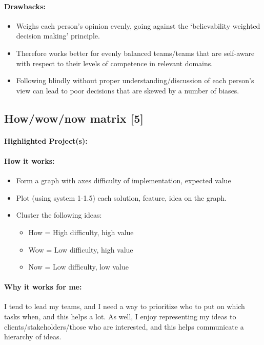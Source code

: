\documentclass[a4paper,12pt]{article}
\begin{document}
\paragraph{Drawbacks: }
\begin{itemize}
	\item Weighs each person’s opinion evenly, going against the ‘believability weighted decision making’ principle.
	\item Therefore works better for evenly balanced teams/teams that are self-aware with respect to their levels of competence in relevant domains.
	\item Following blindly without proper understanding/discussion of each person’s view can lead to poor decisions that are skewed by a number of biases.
\end{itemize}

\subsection{How/wow/now matrix [5]}
\paragraph{Highlighted Project(s): }
\paragraph{How it works: } 
\begin{itemize}
\item Form a graph with axes {difficulty of implementation, expected value}
\item Plot (using system 1-1.5) each solution, feature, idea on the graph.
\item Cluster the following ideas:
\begin{itemize}
\item How = High difficulty, high value
\item Wow = Low difficulty, high value
\item Now = Low difficulty, low value
\end{itemize}
\end{itemize}

\paragraph{Why it works for me: }
I tend to lead my teams, and I need a way to prioritize who to put on which tasks when, and this helps a lot. As well, I enjoy representing my ideas to clients/stakeholders/those who are interested, and this helps communicate a hierarchy of ideas.
\end{document}

